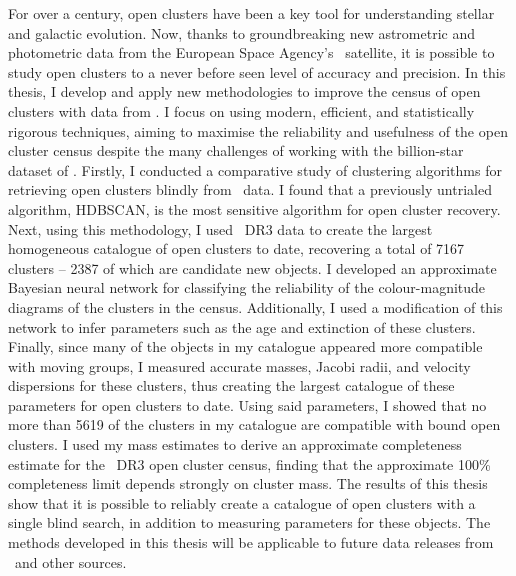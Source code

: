 %

\label{sec:abstract}


For over a century, open clusters have been a key tool for understanding stellar and galactic evolution. 
Now, thanks to groundbreaking new astrometric and photometric data from the European Space Agency's \gaia\ satellite, it is possible to study open clusters to a never before seen level of accuracy and precision. 
In this thesis, I develop and apply new methodologies to improve the census of open clusters with data from \gaia. 
I focus on using modern, efficient, and statistically rigorous techniques, aiming to maximise the reliability and usefulness of the open cluster census despite the many challenges of working with the billion-star dataset of \gaia.
Firstly, I conducted a comparative study of clustering algorithms for retrieving open clusters blindly from \gaia\ data.
I found that a previously untrialed algorithm, HDBSCAN, is the most sensitive algorithm for open cluster recovery.
Next, using this methodology, I used \gaia\ DR3 data to create the largest homogeneous catalogue of open clusters to date, recovering a total of 7167 clusters -- 2387 of which are candidate new objects. 
I developed an approximate Bayesian neural network for classifying the reliability of the colour-magnitude diagrams of the clusters in the census. 
Additionally, I used a modification of this network to infer parameters such as the age and extinction of these clusters. 
Finally, since many of the objects in my catalogue appeared more compatible with moving groups, I measured accurate masses, Jacobi radii, and velocity dispersions for these clusters, thus creating the largest catalogue of these parameters for open clusters to date. 
Using said parameters, I showed that no more than 5619 of the clusters in my catalogue are compatible with bound open clusters. 
I used my mass estimates to derive an approximate completeness estimate for the \gaia\ DR3 open cluster census, finding that the approximate 100\% completeness limit depends strongly on cluster mass. 
The results of this thesis show that it is possible to reliably create a catalogue of open clusters with a single blind search, in addition to measuring parameters for these objects. 
The methods developed in this thesis will be applicable to future data releases from \gaia\ and other sources.


\newpage

